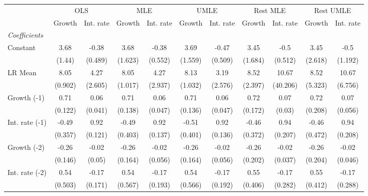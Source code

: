 \begin{table}[htbp] 
	\centering
	\begin{tabular}{@{\extracolsep{4pt}}lcccccccccc@{}}		\hline\hline
		 		 & \multicolumn{2}{c}{OLS} &\multicolumn{2}{c}{MLE} &\multicolumn{2}{c}{UMLE} &\multicolumn{2}{c}{Rest MLE} &\multicolumn{2}{c}{Rest UMLE} \\ 
 		 & Growth 	 & Int. rate 	 & Growth 	 & Int. rate 	 & Growth 	 & Int. rate 	 & Growth 	 & Int. rate 	 & Growth 	 & Int. rate\\\cline{2-3}\cline{4-5}\cline{6-7}\cline{8-9}\cline{10-11}
\rule{0pt}{4ex} 
 \emph{Coefficients} 	  		 & 		 & 		 & 		 & 		 & 		 & 		 & 		 & 		 & 		 &\\ 
\quad Constant 	 & 3.68 	 & -0.38 	 & 3.68 	 & -0.38 	 & 3.69 	 & -0.47 	 & 3.45 	 & -0.5 	 & 3.45 	 & -0.5	 \\ 
 		 & (1.44) 	 & (0.489) 	 & (1.623) 	 & (0.552) 	 & (1.559) 	 & (0.509) 	 & (1.684) 	 & (0.512) 	 & (2.618) 	 & (1.192) 	 \\ 
\quad LR Mean 	 & 8.05 	 & 4.27 	 & 8.05 	 & 4.27 	 & 8.13 	 & 3.19 	 & 8.52 	 & 10.67 	 & 8.52 	 & 10.67	 \\ 
 		 & (0.902) 	 & (2.605) 	 & (1.017) 	 & (2.937) 	 & (1.032) 	 & (2.576) 	 & (2.397) 	 & (40.206) 	 & (5.323) 	 & (6.756) 	 \\ 
\quad Growth (-1) 	 &0.71 	 & 0.06 	 & 0.71 	 & 0.06 	 & 0.71 	 & 0.06 	 & 0.72 	 & 0.07 	 & 0.72 	 & 0.07	 \\ 
 		 & (0.122) 	 & (0.041) 	 & (0.138) 	 & (0.047) 	 & (0.136) 	 & (0.047) 	 & (0.172) 	 & (0.03) 	 & (0.208) 	 & (0.056) 	 \\ 
\quad Int. rate (-1) 	 &-0.49 	 & 0.92 	 & -0.49 	 & 0.92 	 & -0.51 	 & 0.92 	 & -0.46 	 & 0.94 	 & -0.46 	 & 0.94	 \\ 
 		 & (0.357) 	 & (0.121) 	 & (0.403) 	 & (0.137) 	 & (0.401) 	 & (0.136) 	 & (0.372) 	 & (0.207) 	 & (0.472) 	 & (0.208) 	 \\ 
\quad Growth (-2) 	 &-0.26 	 & -0.02 	 & -0.26 	 & -0.02 	 & -0.26 	 & -0.02 	 & -0.26 	 & -0.02 	 & -0.26 	 & -0.02	 \\ 
 		 & (0.146) 	 & (0.05) 	 & (0.164) 	 & (0.056) 	 & (0.164) 	 & (0.056) 	 & (0.202) 	 & (0.037) 	 & (0.204) 	 & (0.046) 	 \\ 
\quad Int. rate (-2) 	 &0.54 	 & -0.17 	 & 0.54 	 & -0.17 	 & 0.54 	 & -0.17 	 & 0.55 	 & -0.17 	 & 0.55 	 & -0.17	 \\ 
 		 & (0.503) 	 & (0.171) 	 & (0.567) 	 & (0.193) 	 & (0.566) 	 & (0.192) 	 & (0.406) 	 & (0.282) 	 & (0.412) 	 & (0.288) 	 \\ 

\end{tabular}
\end{table}
